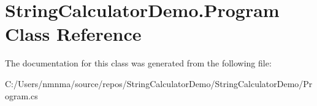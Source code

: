 \hypertarget{class_string_calculator_demo_1_1_program}{}\section{String\+Calculator\+Demo.\+Program Class Reference}
\label{class_string_calculator_demo_1_1_program}


The documentation for this class was generated from the following file\+:\begin{DoxyCompactItemize}
\item 
C\+:/\+Users/nmnma/source/repos/\+String\+Calculator\+Demo/\+String\+Calculator\+Demo/Program.\+cs\end{DoxyCompactItemize}
